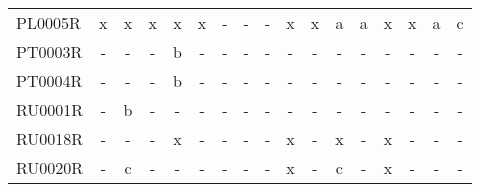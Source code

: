 \begin{table}
{{\begin{tabular}{l|cccccccccccccccc}
        PL0005R &  x &   x &    x &      x &   x &    - &    - &    - &      x &    x &    a &   a &      x &    x &    a &     c \\
        PT0003R &  - &   - &    - &      b &   - &    - &    - &    - &      - &    - &    - &   - &      - &    - &    - &     - \\
        PT0004R &  - &   - &    - &      b &   - &    - &    - &    - &      - &    - &    - &   - &      - &    - &    - &     - \\
        RU0001R &  - &   b &    - &      - &   - &    - &    - &    - &      - &    - &    - &   - &      - &    - &    - &     - \\
        RU0018R &  - &   - &    - &      x &   - &    - &    - &    - &      x &    - &    x &   - &      x &    - &    - &     - \\
        RU0020R &  - &   c &    - &      - &   - &    - &    - &    - &      x &    - &    c &   - &      x &    - &    - &     - \\
\bottomrule
\end{tabular}
 }}
 \end{table}



